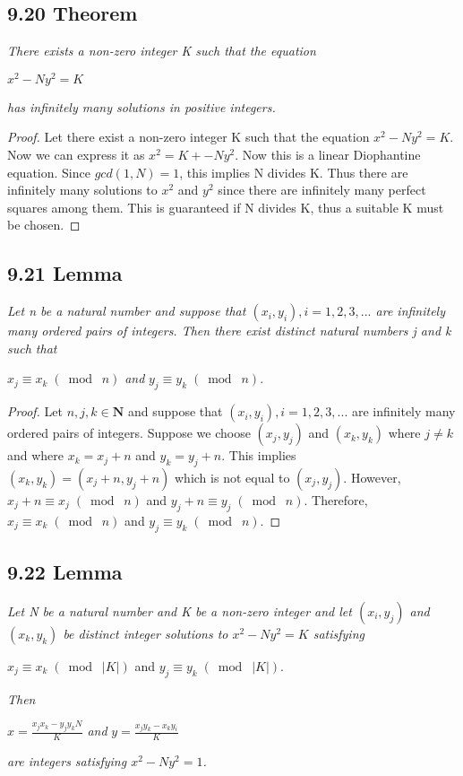 \documentclass{article}
\begin{document}
\subsection*{9.20 Theorem} 
\quad \textit{There exists a non-zero integer K such that the equation}
\begin{center}
    $x^2 - Ny^2 = K$
\end{center}
\textit{has infinitely many solutions in positive integers.}

\begin{proof}
Let there exist a non-zero integer K such that the equation $x^2 - Ny^2 = K$. Now we can express it as $x^2 = K + - Ny^2$. Now this is a linear Diophantine equation. Since $gcd(1, N) = 1$, this implies N divides K. Thus there are infinitely many solutions to $x^2$ and $y^2$ since there are infinitely many perfect squares among them. This is guaranteed if N divides K, thus a suitable K must be chosen.
\end{proof}

\subsection*{9.21 Lemma} 
\quad \textit{Let n be a natural number and suppose that $(x_i, y_i), i = 1,2,3,...$ are infinitely many ordered pairs of integers. Then there exist distinct natural numbers j and k such that}
\begin{center}
    $x_j \equiv x_k \;(\bmod\; n)$\textit{ and }$y_j \equiv y_k \;(\bmod\; n)$.
\end{center}

\begin{proof}
Let $n, j, k \in \mathbf{N}$ and suppose that $(x_i, y_i), i = 1,2,3,...$ are infinitely many ordered pairs of integers. Suppose we choose $(x_j, y_j)$ and $(x_k, y_k)$ where $j \neq k$ and where $x_k = x_j + n$ and $y_k = y_j + n$. This implies $(x_k, y_k) = (x_j + n, y_j + n)$ which is not equal to $(x_j, y_j)$. However, $x_j + n \equiv x_j \;(\bmod\; n)$ and $y_j + n \equiv y_j \;(\bmod\; n)$. Therefore, $x_j \equiv x_k \;(\bmod\; n)$ and $y_j \equiv y_k \;(\bmod\; n)$.
\end{proof}

\subsection*{9.22 Lemma} 
\quad \textit{Let N be a natural number and K be a non-zero integer and let $(x_i, y_j)$ and $(x_k, y_k)$ be distinct integer solutions to $x^2 - Ny^2 = K$ satisfying}
\begin{center}
    $x_j \equiv x_k \;(\bmod\; |K|)$ and $y_j \equiv y_k \;(\bmod\; |K|)$.
\end{center}
\textit{Then}
\begin{center}
    $x = \frac{x_jx_k-y_jy_kN}{K}$\textit{ and }$y = \frac{x_jy_k-x_ky_i}{K}$
\end{center}
\textit{are integers satisfying $x^2 - Ny^2 = 1$.}
\end{document}
